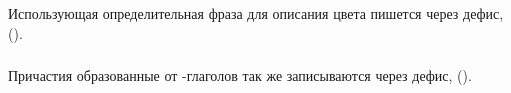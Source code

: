 \subsubsection{} Использующая   определительная фраза для описания цвета
пишется через дефис,   ().

\subsubsection{} Причастия образованные от  -глаголов так же записываются через дефис,  
().

